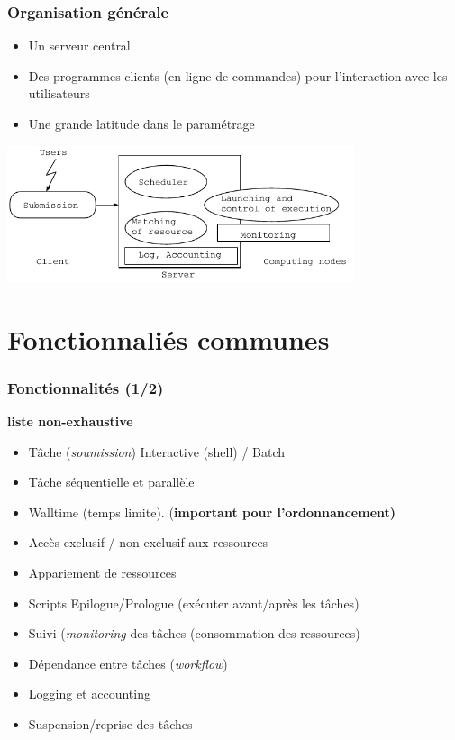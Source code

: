 \documentclass{beamer}
\begin{document}
\begin{frame}
	\frametitle{Organisation générale}

	\begin{itemize}
		\item Un serveur central
		\item Des programmes clients (en ligne de commandes) pour l'interaction avec les utilisateurs
		\item Une grande latitude dans le paramétrage
	\end{itemize}

	\begin{center}
		\includegraphics[height=4cm]{Batch_organization.pdf}
	\end{center}

\end{frame}

\section{Fonctionnaliés communes}

\begin{frame}
\frametitle{Fonctionnalités (1/2)}
	{\bf liste non-exhaustive}
		\begin{itemize}
		\item Tâche ({\em soumission}) Interactive (shell) / Batch
		\item Tâche séquentielle et parallèle
		\item Walltime (temps limite). ({\bf important pour l'ordonnancement)}
		\item Accès exclusif / non-exclusif aux ressources 
		\item Appariement de ressources
		\item Scripts Epilogue/Prologue (exécuter avant/après les tâches)
		\item Suivi ({\em monitoring} des tâches (consommation des ressources)
		\item Dépendance entre tâches ({\em workflow})
		\item Logging et accounting
		\item Suspension/reprise des tâches 
	\end{itemize}
\end{frame}
\end{document}
